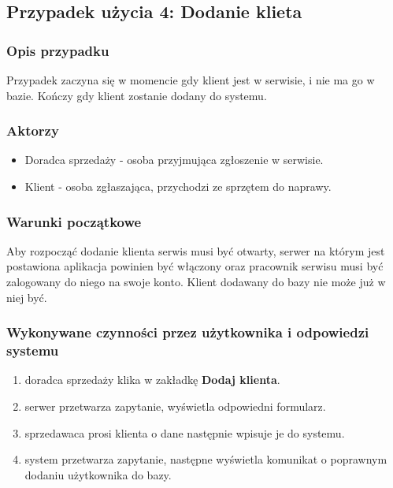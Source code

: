 \documentclass{article}
\begin{document}
\subsection{Przypadek użycia 4: Dodanie klieta}
\subsubsection{Opis przypadku}
Przypadek zaczyna się w momencie gdy klient jest w serwisie, i nie ma go w bazie. Kończy gdy klient zostanie dodany do systemu.
\subsubsection{Aktorzy}
\begin{itemize}
    \item Doradca sprzedaży - osoba przyjmująca zgłoszenie w serwisie.
    \item Klient - osoba zgłaszająca, przychodzi ze sprzętem do naprawy.
\end{itemize}
\subsubsection{Warunki początkowe}
Aby rozpocząć dodanie klienta serwis musi być otwarty, serwer na którym jest postawiona aplikacja powinien być włączony oraz pracownik serwisu musi być zalogowany do niego
na swoje konto. Klient dodawany do bazy nie może już w niej być.
\subsubsection{Wykonywane czynności przez użytkownika i odpowiedzi systemu}
\begin{enumerate}
    \item doradca sprzedaży klika w zakładkę \textbf{Dodaj klienta}.
    \item serwer przetwarza zapytanie, wyświetla odpowiedni formularz.
    \item sprzedawaca prosi klienta o dane następnie wpisuje je do systemu.
    \item system przetwarza zapytanie, następne wyświetla komunikat o poprawnym dodaniu użytkownika do bazy.
\end{enumerate}
\end{document}
